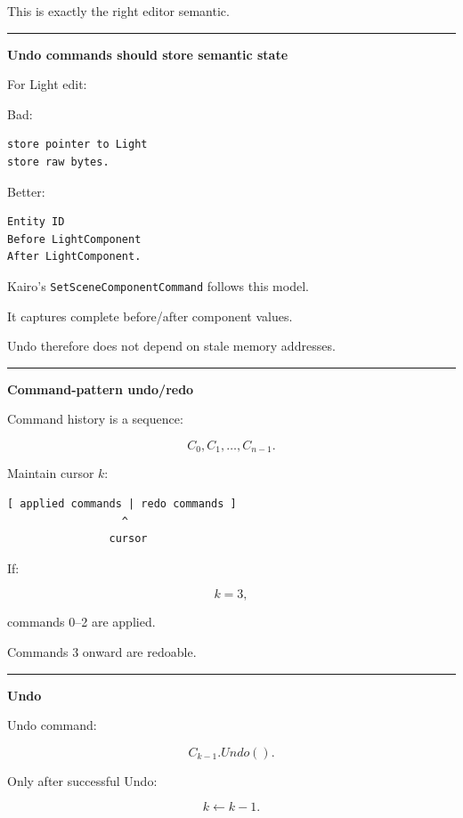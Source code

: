 This is exactly the right editor semantic.

\begin{center}\rule{0.5\linewidth}{0.5pt}\end{center}

\textbf{Undo commands should store semantic state}

For Light edit:

Bad:

\begin{verbatim}
store pointer to Light
store raw bytes.
\end{verbatim}

Better:

\begin{verbatim}
Entity ID
Before LightComponent
After LightComponent.
\end{verbatim}

Kairo's \texttt{SetSceneComponentCommand} follows this model.

It captures complete before/after component values.

Undo therefore does not depend on stale memory addresses.

\begin{center}\rule{0.5\linewidth}{0.5pt}\end{center}

\textbf{Command-pattern undo/redo}

Command history is a sequence:

\[
C_0,C_1,\dots,C_{n-1}.
\]

Maintain cursor \(k\):

\begin{verbatim}
[ applied commands | redo commands ]
                  ^
                cursor
\end{verbatim}

If:

\[
k=3,
\]

commands 0--2 are applied.

Commands 3 onward are redoable.

\begin{center}\rule{0.5\linewidth}{0.5pt}\end{center}

\textbf{Undo}

Undo command:

\[
C_{k-1}.Undo().
\]

Only after successful Undo:

\[
k\leftarrow k-1.
\]

